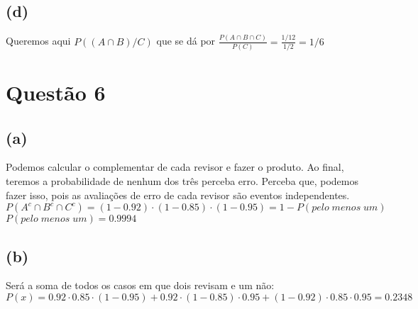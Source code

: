 \documentclass{article}
\begin{document}
\subsection*{(d)}
Queremos aqui $P((A \cap B) / C)$ que se dá por $\frac{P(A \cap B \cap C)}{P(C)} = \frac{1 / 12}{1 / 2} = 1/6$


\section*{Questão 6}

\subsection*{(a)}
Podemos calcular o complementar de cada revisor e fazer o produto. Ao final, teremos a probabilidade de nenhum dos três perceba erro. Perceba que, podemos fazer isso, pois as avaliações de erro de cada revisor são eventos independentes.
\vspace{\baselineskip}\\
$P(A^c \cap B^c \cap C^c) = (1 - 0.92) \cdot (1 - 0.85) \cdot (1 - 0.95) = 1 - P(pelo\;menos\;um)$
\vspace{\baselineskip}\\
$P(pelo\;menos\;um) = 0.9994$

\subsection*{(b)}
Será a soma de todos os casos em que dois revisam e um não:
\vspace{\baselineskip}\\
$P(x) = 0.92 \cdot 0.85 \cdot (1 - 0.95) + 0.92 \cdot (1 - 0.85) \cdot 0.95 + (1 - 0.92) \cdot 0.85 \cdot 0.95 = 0.2348$
\end{document}
